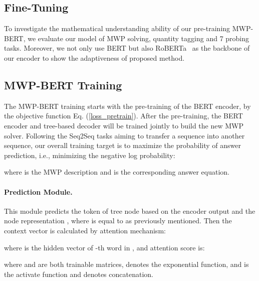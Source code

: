\documentclass[11pt]{article}
\begin{document}
\subsection{Fine-Tuning}
To investigate the mathematical understanding ability of our pre-training MWP-BERT, we evaluate our model of MWP solving, quantity tagging and 7 probing tasks. Moreover, we not only use BERT but also RoBERTa~\cite{liu2019roberta} as the backbone of our encoder to show the adaptiveness of proposed method. 





























\iffalse

\subsection{MWP-BERT Training}
The MWP-BERT training starts with the pre-training of the BERT encoder, by the objective function Eq. (\ref{loss_pretrain}). 
After the pre-training, the BERT encoder and tree-based decoder will be trained jointly to build the new MWP solver. Following the Seq2Seq tasks aiming to transfer a sequence into another sequence, our overall training target is to maximize the probability of answer prediction, i.e., minimizing the negative log probability:

where  is the MWP description and  is the corresponding answer equation. 

\paragraph{Prediction Module.}
This module predicts the token of tree node based on the encoder output  and the node representation , where  is equal to  as previously mentioned. Then the context vector  is calculated by attention mechanism:

where  is the hidden vector of -th word in , and attention score  is:

where  and  are both trainable matrices,  denotes the exponential function, and  is the activate function and  denotes concatenation.
\end{document}
